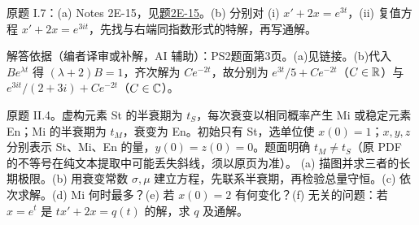 \begin{exercise}\label{cw:ps2-I-7}原题 I.7：(a) Notes 2E-15，见\hyperref[cw:bank-2E-15]{题2E-15}。(b) 分别对 (i) $x'+2x=e^{3t}$，(ii) 复值方程 $x'+2x=e^{3it}$，先找与右端同指数形式的特解，再写通解。\end{exercise}
\begin{solution}解答依据（编者译审或补解，AI 辅助）：PS2题面第3页。(a)见链接。(b)代入 $Be^{\lambda t}$ 得 $(\lambda+2)B=1$，齐次解为 $Ce^{-2t}$，故分别为 $e^{3t}/5+Ce^{-2t}$（$C\in\mathbb R$）与 $e^{3it}/(2+3i)+Ce^{-2t}$（$C\in\mathbb C$）。\end{solution}
\begin{exercise}\label{cw:ps2-II-4}
原题 II.4。虚构元素 St 的半衰期为 $t_S$，每次衰变以相同概率产生 Mi 或稳定元素 En；Mi 的半衰期为 $t_M$，衰变为 En。初始只有 St，选单位使 $x(0)=1$；$x,y,z$ 分别表示 St、Mi、En 的量，$y(0)=z(0)=0$。题面明确 $t_M\ne t_S$（原 PDF 的不等号在纯文本提取中可能丢失斜线，须以原页为准）。
(a) 描图并求三者的长期极限。(b) 用衰变常数 $\sigma,\mu$ 建立方程，先联系半衰期，再检验总量守恒。(c) 依次求解。(d) Mi 何时最多？(e) 若 $x(0)=2$ 有何变化？(f) 无关的问题：若 $x=e^t$ 是 $tx'+2x=q(t)$ 的解，求 $q$ 及通解。
\end{exercise}
